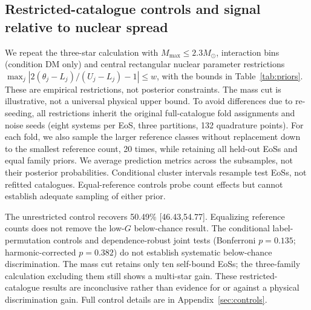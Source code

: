 \documentclass[11pt,a4paper]{article}
\newcommand{\Msun}{M_\odot}
\begin{document}
\subsection{Restricted-catalogue controls and signal relative to nuclear spread}\label{sec:sensitivity}
We repeat the three-star calculation with $M_{\max}\leq2.3\Msun$, interaction bins (condition DM only) and central rectangular nuclear parameter restrictions $\max_j|2(\theta_j-L_j)/(U_j-L_j)-1|\le w$, with the bounds in Table~\ref{tab:priors}. These are empirical restrictions, not posterior constraints. The mass cut is illustrative, not a universal physical upper bound. To avoid differences due to re-seeding, all restrictions inherit the original full-catalogue fold assignments and noise seeds (eight systems per EoS, three partitions, 132 quadrature points). For each fold, we also sample the larger reference classes without replacement down to the smallest reference count, 20 times, while retaining all held-out EoSs and equal family priors. We average prediction metrics across the subsamples, not their posterior probabilities. Conditional cluster intervals resample test EoSs, not refitted catalogues. Equal-reference controls probe count effects but cannot establish adequate sampling of either prior.
\begin{table}[htbp]\centering\scriptsize
\caption{Count-matched three-star binary accuracy (\%, conditional cluster interval), central 95\% label-permutation null range, nominal lower-tail permutation probability, and fixed-mass signal diagnostics. Nuclear spread $\sigma^N_f$ includes a 95\% percentile interval; paired median shifts $s_f,s_R,s_\Lambda$ are percentages at $1.4\Msun$. All pairs in each DM selection have a matched nuclear baseline.}\label{tab:sensitivity}
\end{table}
The unrestricted control recovers 50.49\% [46.43,54.77]. Equalizing reference counts does not remove the low-$G$ below-chance result. The conditional label-permutation controls and dependence-robust joint tests (Bonferroni $p=0.135$; harmonic-corrected $p=0.382$) do not establish systematic below-chance discrimination. The mass cut retains only ten self-bound EoSs; the three-family calculation excluding them still shows a multi-star gain. These restricted-catalogue results are inconclusive rather than evidence for or against a physical discrimination gain. Full control details are in Appendix~\ref{sec:controls}.
\end{document}
